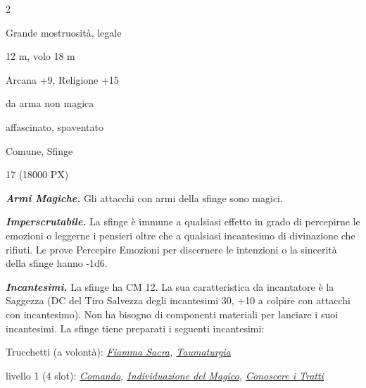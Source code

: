 \begin{multicols}{2}
{
\begin{description}[noitemsep, topsep=0pt, parsep=0pt, partopsep=0pt, itemsep=1pt, leftmargin=2.35cm,  labelwidth=2.2cm, itemindent=0cm, listparindent=0pt] %
\setlength{\baselineskip}{10pt}
\item[\textbf{Taglia/Tipo}] Grande mostruosità, legale
\item[\textbf{Caratt.}] 
\item[\textbf{Punti Ferita}] 
\item[\textbf{Movimento}] 12 m, volo 18 m
\item[\textbf{Tiri Salvez.}] 
\item[\textbf{Comp.}] Arcana +9, Religione +15
\item[\textbf{Imm. Danni}] da arma non magica
\item[\textbf{Immunità}] affascinato, spaventato
\item[\textbf{Sensi}] 
\item[\textbf{Linguaggi}] Comune, Sfinge
\item[\textbf{Sfida}] 17 (18000 PX)
\end{description}
\smallskip

\emph{\textbf{Armi Magiche.}} Gli attacchi con armi della sfinge sono magici.

\emph{\textbf{Imperscrutabile.}} La sfinge è immune a qualsiasi effetto in grado di percepirne le emozioni o leggerne i pensieri oltre che a qualsiasi incantesimo di divinazione che rifiuti. Le prove Percepire Emozioni per discernere le intenzioni o la sincerità della sfinge hanno -1d6.

\emph{\textbf{Incantesimi.}} La sfinge ha CM 12.
La sua caratteristica da incantatore è la Saggezza (DC del Tiro Salvezza degli incantesimi 30, +10 a colpire con attacchi con incantesimo). Non ha bisogno di componenti materiali per lanciare i suoi incantesimi. La sfinge tiene preparati i seguenti incantesimi:

Trucchetti (a volontà): \emph{\hyperlink{Fiamma Sacra}{Fiamma Sacra}, \hyperlink{Taumaturgia}{Taumaturgia}}

livello 1 (4 slot): \emph{\hyperlink{Comando}{Comando}, \hyperlink{Individuazione del Magico}{Individuazione del Magico}, \hyperlink{Conoscere i Tratti}{Conoscere i Tratti}}

}
\end{multicols}
